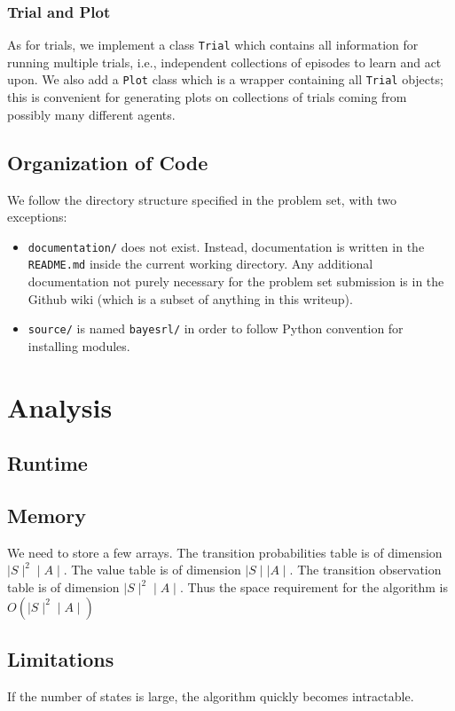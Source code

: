 \documentclass{pset}
\begin{document}
\subsubsection{Trial and Plot}
As for trials, we implement a class \texttt{Trial} which contains all information for running multiple trials, i.e., independent collections of episodes to learn and act upon. We also add a \texttt{Plot} class which is a wrapper containing all \texttt{Trial} objects; this is convenient for generating plots on collections of trials coming from possibly many different agents.

\subsection{Organization of Code}
We follow the directory structure specified in the problem set, with two
exceptions:
\begin{itemize}
\item \texttt{documentation/} does not exist. Instead, documentation is written
in the \texttt{README.md} inside the current working directory. Any additional
documentation not purely necessary for the problem set submission is in the
Github wiki (which is a subset of anything in this writeup).
\item \texttt{source/} is named \texttt{bayesrl/} in order to follow Python
convention for installing modules.
\end{itemize}

\section{Analysis}

\subsection{Runtime}

\subsection{Memory}
We need to store a few arrays. The transition probabilities table is of dimension $\mid S \mid ^2
\mid A \mid$. The value table is of dimension $\mid S \mid \mid A \mid$. The transition
observation table is of dimension $\mid S \mid ^2 \mid A \mid$. Thus the space requirement for the
algorithm is $O(\mid S \mid ^2 \mid A \mid)$

\subsection{Limitations}
If the number of states is large, the algorithm quickly becomes intractable.
\end{document}

